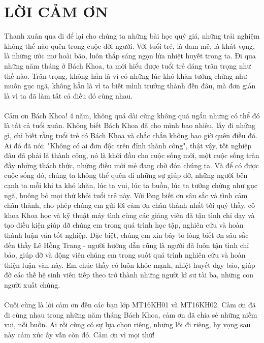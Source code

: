 \documentclass[a4paper, 12pt, oneside]{report}
\begin{document}
\coverpage

\frontmatter




\chapter*{LỜI CẢM ƠN}
Thanh xuân qua đi để lại cho chúng ta những bài học quý giá, những trải nghiệm không thể nào quên trong cuộc đời người. Với tuổi trẻ, là đam mê, là khát vọng, là những ước mơ hoài bão, luôn thắp sáng ngọn lửa nhiệt huyết trong ta. Đi qua những năm tháng ở Bách Khoa, ta mới hiểu được tuổi trẻ đáng trân trọng như thế nào. Trân trọng, không hẳn là vì có những lúc khó khăn tưởng chừng như muốn gục ngã, không hẳn là vì ta biết mình trưởng thành đến đâu, mà đơn giản là vì ta đã làm tất cả điều đó cùng nhau.\\ \\
Cảm ơn Bách Khoa! 4 năm, không quá dài cũng không quá ngắn nhưng có thể đó là tất cả tuổi xuân. Không biết Bách Khoa đã cho mình bao nhiêu, lấy đi những gì, chỉ biết rằng tuổi trẻ có Bách Khoa và chắc chắn không bao giờ quên điều đó. Ai đó đã nói: "Không có ai đơn độc trên đỉnh thành công", thật vậy, tốt nghiệp đâu đã phải là thành công, nó là khởi đầu cho cuộc sống mới, một cuộc sống tràn đầy những thách thức, những điều mới mẻ đang chờ đón chúng ta. Và để có được cuộc sống đó, chúng ta không thể quên đi những sự giúp đỡ, những người bên cạnh ta mỗi khi ta khó khăn, lúc ta vui, lúc ta buồn, lúc ta tưởng chừng như gục ngã, buông bỏ mọi thứ khỏi tuổi trẻ này. Với lòng biết ơn sâu sắc và tình cảm chân thành, cho phép chúng em gửi lời cảm ơn chân thành nhất tới quý thầy, cô khoa Khoa học và kỹ thuật máy tình cùng các giảng viên đã tận tình chỉ dạy và tạo điều kiện giúp đỡ chúng em trong quá trình học tập, nghiên cứu và hoàn thành luận văn tốt nghiệp. Đặc biệt, chúng em xin bày tỏ lòng biết ơn sâu sắc đến thầy Lê Hồng Trang - người hướng dẫn cũng là người đã luôn tận tình chỉ bảo, giúp đỡ và động viên chúng em trong suốt quá trình nghiên cứu và hoàn thiện luận văn này. Em chúc thầy cô luôn khỏe mạnh, nhiệt huyết dạy bảo, giúp đỡ các thế hệ sinh viên tiếp theo trở thành những người kĩ sư tài ba, những con người xuất chúng.\\ \\
Cuối cùng là lời cảm ơn đến các bạn lớp MT16KH01 và MT16KH02. Cảm ơn đã đi cùng nhau trong những năm tháng Bách Khoa, cảm ơn đã chia sẻ những niềm vui, nỗi buồn. Ai rồi cùng có sự lựa chọn riêng, những lối đi riêng, hy vọng sau này cảm xúc ấy vẫn còn đó. Cảm ơn vì mọi thứ!
\end{document}
